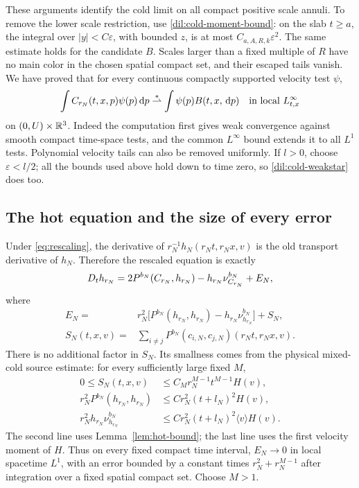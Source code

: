 These arguments identify the cold limit on all compact positive
scale annuli. To remove the lower scale restriction, use
\eqref{dil:cold-moment-bound}: on the slab \(t\geq a\), the integral
over \(|y|<C\varepsilon\), with bounded \(z\), is at most
\(C_{a,A,R,k}\varepsilon^2\). The same estimate holds for the
candidate \(B\). Scales larger than a fixed multiple of \(R\) have
no main color in the chosen spatial compact set, and their escaped
tails vanish. We have proved that for every continuous compactly
supported velocity test \(\psi\),
\begin{equation}\label{dil:cold-weakstar}
\int C_{r_N}(t,x,p)\psi(p)\,\mathrm d p
\stackrel{*}{\rightharpoonup}
\int\psi(p)B(t,x,\,\mathrm d p)
\quad\hbox{in local }L^\infty_{t,x}
\end{equation}
on \((0,U)\times\mathbb R^3\). Indeed the computation first gives weak
convergence against smooth compact time-space tests, and the common
\(L^\infty\) bound extends it to all \(L^1\) tests. Polynomial
velocity tails can also be removed uniformly. If \(l>0\), choose
\(\varepsilon<l/2\); all the bounds used above hold down to time
zero, so \eqref{dil:cold-weakstar} does too.

\subsection{The hot equation and the size of every error}

Under \eqref{eq:rescaling}, the derivative of \(r_N^{-1}h_N(r_Nt,r_Nx,v)\)
is the old transport derivative of \(h_N\). Therefore the rescaled
equation is exactly
\begin{equation}\label{dil:prelimit-equation}
D_t h_{r_N}
=2P^{b_N}(C_{r_N},h_{r_N})
 -h_{r_N}\nu^{b_N}_{C_{r_N}}+E_N,
\end{equation}
where
\[
\begin{split}
E_N={}&r_N^2\bigl[P^{b_N}(h_{r_N},h_{r_N})
                  -h_{r_N}\nu^{b_N}_{h_{r_N}}\bigr]+S_N,\\
S_N(t,x,v)={}&\sum_{i\ne j}
 P^{b_N}(c_{i,N},c_{j,N})(r_Nt,r_Nx,v).
\end{split}
\]
There is no additional factor in \(S_N\). Its smallness comes from
the physical mixed-cold source estimate: for every sufficiently large
fixed \(M\),
\begin{equation}\label{dil:error-bounds}
\begin{split}
0\leq S_N(t,x,v)&\leq C_M r_N^{M-1}t^{M-1}H(v),\\
r_N^2P^{b_N}(h_{r_N},h_{r_N})
&\leq C r_N^2(t+l_N)^2H(v),\\
r_N^2h_{r_N}\nu^{b_N}_{h_{r_N}}
&\leq C r_N^2(t+l_N)^2\langle v\rangle H(v).
\end{split}
\end{equation}
The second line uses Lemma~\ref{lem:hot-bound}; the last line uses
the first velocity moment of \(H\). Thus on every fixed compact
time interval, \(E_N\to0\) in local spacetime \(L^1\), with an
error bounded by a constant times \(r_N^2+r_N^{M-1}\) after
integration over a fixed spatial compact set. Choose \(M>1\).

